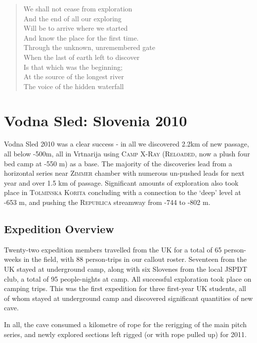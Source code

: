 \begin{verse}
We shall not cease from exploration  \\
And the end of all our exploring  \\
Will be to arrive where we started  \\
And know the place for the first time.  \\
Through the unknown, unremembered gate  \\
When the last of earth left to discover  \\
Is that which was the beginning;  \\
At the source of the longest river  \\
The voice of the hidden waterfall \\
\end{verse}


\chapter{Vodna Sled: Slovenia 2010}

Vodna Sled 2010 was a clear success - in all we discovered 2.2km of new
passage, all below -500m, all in Vrtnarija using \textsc{Camp
X-Ray} (\textsc{Reloaded}, now a plush four bed camp at -550 m) as a
base. The majority of the discoveries lead from a horizontal series near
\textsc{Zimmer} chamber with numerous un-pushed leads for next year and
over 1.5 km of passage. Significant amounts of exploration also took
place in \textsc{Tolminska Korita} concluding with a connection to the
`deep' level at -653 m, and pushing the \textsc{Republica} streamway
from -744 to -802 m.

\section{Expedition Overview}

Twenty-two expedition members travelled from the UK for a total of 65
person-weeks in the field, with 88 person-trips in our callout roster.
Seventeen from the UK stayed at underground camp, along with six
Slovenes from the local JSPDT club, a total of 95 people-nights at camp.
All successful exploration took place on camping trips. This was the
first expedition for three first-year UK students, all of whom stayed at
underground camp and discovered significant quantities of new cave.

In all, the cave consumed a kilometre of rope for the rerigging of the
main pitch series, and newly explored sections left rigged (or with rope
pulled up) for 2011.

